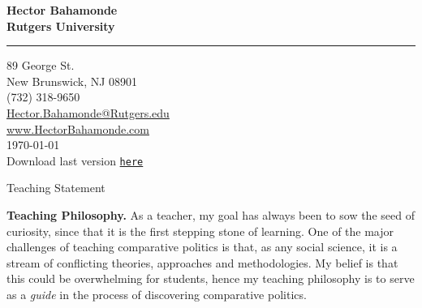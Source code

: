 \documentclass[11pt]{letter} %
\date{}
\begin{document}

\begin{letter}{} 


\begin{center}
\large\bf Hector Bahamonde \\ %
Rutgers University\\
\vspace{20pt} \hrule height 1pt %
89 George St. \\ New Brunswick, NJ 08901 \\ (732) 318-9650 \\ 
{\normalfont\normalsize\href{mailto:hector.bahamonde@rutgers.edu}{Hector.Bahamonde@Rutgers.edu}} \\
{\normalfont\normalsize\href{http://www.hectorbahamonde.com}{www.HectorBahamonde.com}}\\
{\normalfont \scriptsize{
\vspace{5mm}\today\\
Download last version \href{http://github.com/hbahamonde/Job_Market/raw/master/Bahamonde_Teaching_Statement.pdf}{\texttt{{\color{red}here}}}}} %


{\huge\vspace{8mm} Teaching Statement}
\end{center} 

\signature{} %

\opening{} 
 
{\bf Teaching Philosophy.} As a teacher, my goal has always been to sow the seed of curiosity, since that it is the first stepping stone of learning. One of the major challenges of teaching comparative politics is that, as any social science, it is a stream of conflicting theories, approaches and methodologies. My belief is that this could be overwhelming for students, hence my teaching philosophy is to serve as a \emph{guide} in the process of discovering comparative politics.


\end{letter}
\end{document}
